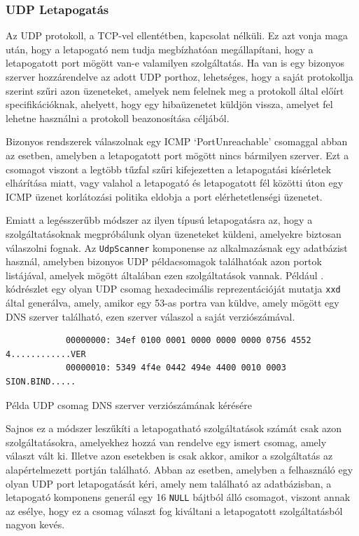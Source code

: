 \documentclass[a4paper,12pt]{article}
\begin{document}
\subsubsection{UDP Letapogatás} \label{ssec:udpscan}

	Az UDP protokoll, a TCP-vel ellentétben, kapcsolat nélküli. Ez azt vonja maga után, hogy a letapogató nem tudja megbízhatóan megállapítani, hogy a letapogatott port mögött van-e valamilyen szolgáltatás. Ha van is egy bizonyos szerver hozzárendelve az adott UDP porthoz, lehetséges, hogy a saját protokollja szerint szűri azon üzeneteket, amelyek nem felelnek meg a protokoll által előírt specifikációknak, ahelyett, hogy egy hibaüzenetet küldjön vissza, amelyet fel lehetne használni a protokoll beazonosítása céljából.
	
	Bizonyos rendszerek válaszolnak egy ICMP `PortUnreachable' csomaggal abban az esetben, amelyben a letapogatott port mögött nincs bármilyen szerver. Ezt a csomagot viszont a legtöbb tűzfal szűri kifejezetten a letapogatási kísérletek elhárítása miatt, vagy valahol a letapogató és letapogatott fél közötti úton egy ICMP üzenet korlátozási politika eldobja a port elérhetetlenségi üzenetet.
	
	Emiatt a legésszerűbb módszer az ilyen típusú letapogatásra az, hogy a szolgáltatásoknak megpróbálunk olyan üzeneteket küldeni, amelyekre biztosan válaszolni fognak. Az \texttt{UdpScanner} komponense az alkalmazásnak egy adatbázist használ, amelyben bizonyos UDP példacsomagok találhatóak azon portok listájával, amelyek mögött általában ezen szolgáltatások vannak. Például \az{\ref{dnsverreq}}. kódrészlet egy olyan UDP csomag hexadecimális reprezentációját mutatja \texttt{xxd} által generálva, amely, amikor egy 53-as portra van küldve, amely mögött egy DNS szerver található, ezen szerver válaszol a saját verziószámával.

	\begin{listing}[H]
		\begin{verbatim}
			00000000: 34ef 0100 0001 0000 0000 0000 0756 4552  4............VER
			00000010: 5349 4f4e 0442 494e 4400 0010 0003       SION.BIND.....
		\end{verbatim}
		\caption{Példa UDP csomag DNS szerver verziószámának kérésére}
		\label{dnsverreq}
	\end{listing}
	
	Sajnos ez a módszer leszűkíti a letapogatható szolgáltatások számát csak azon szolgáltatásokra, amelyekhez hozzá van rendelve egy ismert csomag, amely választ vált ki. Illetve azon esetekben is csak akkor, amikor a szolgáltatás az alapértelmezett portján található. Abban az esetben, amelyben a felhasználó egy olyan UDP port letapogatását kéri, amely nem található az adatbázisban, a letapogató komponens generál egy 16 \texttt{NULL} bájtból álló csomagot, viszont annak az esélye, hogy ez a csomag választ fog kiváltani a letapogatott szolgáltatásból nagyon kevés.
	
\end{document}
